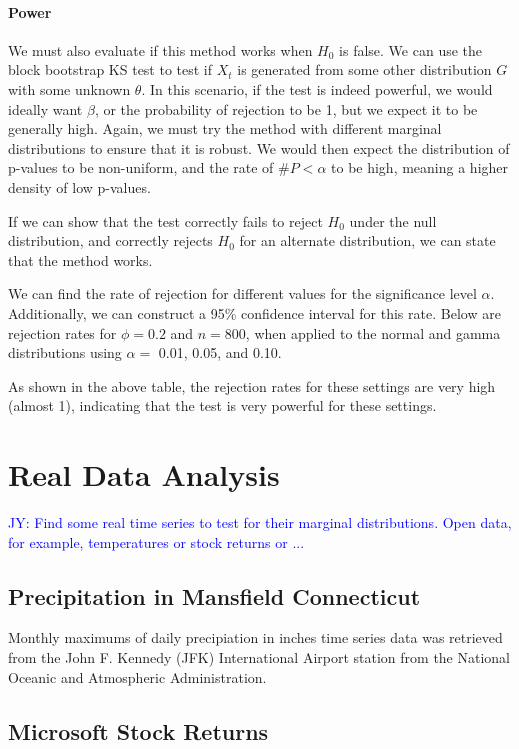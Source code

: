 \documentclass[12pt, letterpaper]{article}
\newcommand{\jy}[1]{\textcolor{blue}{JY: #1}}
\newcommand{\mc}[1]{\textcolor{green}{MC: (#1)}}
\begin{document}
\paragraph{Power}
We must also evaluate if this method works when $H_0$ is false. We can use
the block bootstrap KS test to test if $X_t$ is generated from some other 
distribution $G$ with some unknown $\theta$. In this scenario, if the test is 
indeed powerful,
we would ideally want $\beta$, or the probability of rejection to be 1, but we
expect it to be generally high. Again, we must try the method with different
marginal distributions to ensure that it is robust.
We would then expect the distribution of p-values to be non-uniform, and the rate
of $\#P < \alpha$ to be high, meaning a higher density of low p-values.

If we can show that the test correctly fails to reject $H_0$ under the null
distribution, and correctly rejects $H_0$ for an alternate distribution, we can
state that the method works.

We can find the rate of rejection for  different values for the significance 
level $\alpha$. Additionally, we can construct a 95\% confidence interval for 
this rate. Below are rejection rates for $\phi = 0.2$ and $n = 800$, when
applied to the normal and gamma distributions using $\alpha =$ 0.01, 0.05, and 
0.10.



As shown in the above table, the rejection rates for these settings are very 
high (almost 1), indicating that the test is very powerful for these settings.

\section{Real Data Analysis}

\jy{Find some real time series to test for their marginal distributions. Open
  data, for example, temperatures or stock returns or ...}

\subsection{Precipitation in Mansfield Connecticut}
Monthly maximums of daily precipiation in inches time series data was retrieved 
from the John F. Kennedy (JFK) International Airport station from the 
National Oceanic and Atmospheric Administration.

\subsection{Microsoft Stock Returns}
\end{document}
